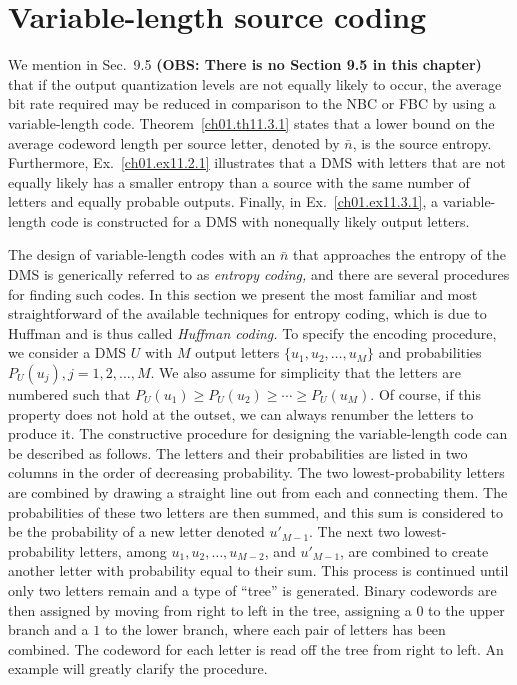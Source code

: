 \section{Variable-length source coding}
\label{ch01.sec11.7}

We mention in Sec.~9.5
\textbf{(OBS: There is no Section 9.5 in this chapter) }
that if the output quantization levels are not equally
likely to occur, the average bit rate required may be reduced
in comparison to the NBC or FBC by using a variable-length code.
Theorem~\ref{ch01.th11.3.1} states that a lower bound on
the average codeword length per source letter,
denoted by $\bar{n}$, is the source entropy.
Furthermore, Ex.~\ref{ch01.ex11.2.1} illustrates that a DMS
with letters that are not equally likely has a smaller
entropy than a source with the same number of letters
and equally probable outputs.
Finally, in Ex.~\ref{ch01.ex11.3.1}, a variable-length code
is constructed for a DMS with nonequally likely output letters.

The design of variable-length codes with an $\bar{n}$ that
approaches the entropy of the DMS is generically referred to
as \textit{entropy coding,} and there are several procedures
for finding such codes.
In this section we present the most familiar and most
straightforward of the available techniques for entropy coding,
which is due to Huffman and
is thus called \textit{Huffman coding.}
To specify the encoding procedure, we consider a DMS $U$ with
$M$ output letters $\{u_1, u_2, \ldots, u_M\}$
and probabilities $P_U (u_j), j = 1, 2, \ldots, M.$
We also assume for simplicity that the letters are numbered
such that $P_U (u_1) \geq P_U (u_2) \geq \cdots \geq P_U (u_M)$.
Of course, if this property does not hold at the outset, we can
always renumber the letters to produce it.
The constructive procedure for designing the variable-length
code can be described as follows.
The letters and their probabilities are listed in two columns
in the order of decreasing probability.
The two lowest-probability letters are combined by drawing
a straight line out from each and connecting them.
The probabilities of these two letters are then summed, and this sum
is considered to be the probability of a new letter denoted
$u'_{M - 1}$.
The next two lowest-probability letters, among
$u_1, u_2, \ldots, u_{M-2}$, and $u'_{M-1}$,
are combined to create another letter with probability equal to their sum.
This process is continued until only two letters remain and a type of
``tree'' is generated.
Binary codewords are then assigned by moving from right to left
in the tree, assigning a $0$ to the upper branch and a $1$ to the lower
branch, where each pair of letters has been combined.
The codeword for each letter is read off the tree from right to left.
An example will greatly clarify the procedure.

